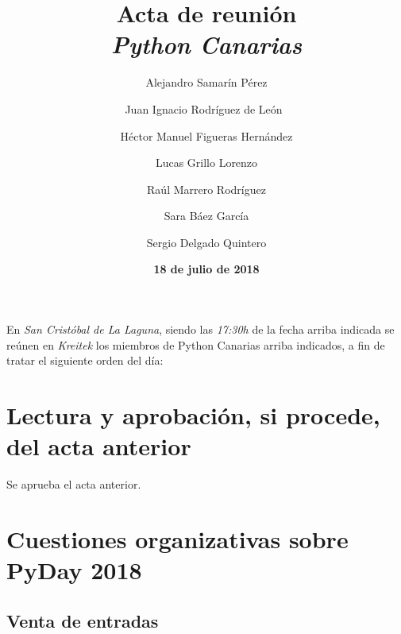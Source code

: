 \documentclass[a4paper, 12pt]{article}
\title{\huge \textbf{Acta de reunión} \\ \textit{Python Canarias}}
\date{\textbf{18 de julio de 2018}}
\author{
    Alejandro Samarín Pérez \and
    Juan Ignacio Rodríguez de León\ \and 
    Héctor Manuel Figueras Hernández \and
    Lucas Grillo Lorenzo \and
    Raúl Marrero Rodríguez \and
    Sara Báez García \and
    Sergio Delgado Quintero
}
\begin{document}
\renewcommand{\contentsname}{Orden del día}

\maketitle

En \textit{San Cristóbal de La Laguna}, siendo las \textit{17:30h} de la fecha arriba indicada se reúnen en \textit{Kreitek} los miembros de Python Canarias arriba indicados, a fin de tratar el siguiente orden del día:

\tableofcontents

\section{Lectura y aprobación, si procede, del acta anterior}

Se aprueba el acta anterior.

\section{Cuestiones organizativas sobre PyDay 2018}

\subsection*{Venta de entradas}
\end{document}
